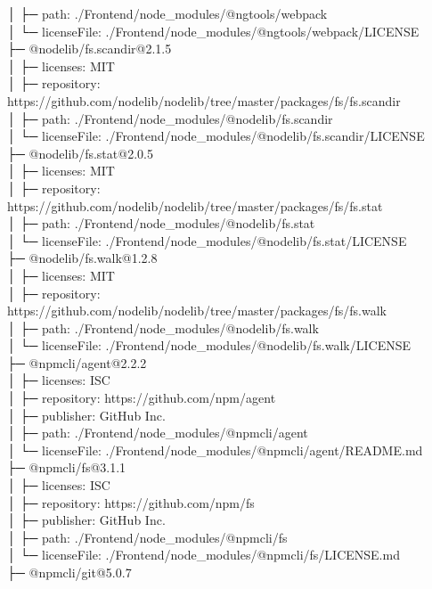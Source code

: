 │  ├─ path: ./Frontend/node\_modules/@ngtools/webpack\\
│  └─ licenseFile: ./Frontend/node\_modules/@ngtools/webpack/LICENSE\\
├─ @nodelib/fs.scandir@2.1.5\\
│  ├─ licenses: MIT\\
│  ├─ repository: https://github.com/nodelib/nodelib/tree/master/packages/fs/fs.scandir\\
│  ├─ path: ./Frontend/node\_modules/@nodelib/fs.scandir\\
│  └─ licenseFile: ./Frontend/node\_modules/@nodelib/fs.scandir/LICENSE\\
├─ @nodelib/fs.stat@2.0.5\\
│  ├─ licenses: MIT\\
│  ├─ repository: https://github.com/nodelib/nodelib/tree/master/packages/fs/fs.stat\\
│  ├─ path: ./Frontend/node\_modules/@nodelib/fs.stat\\
│  └─ licenseFile: ./Frontend/node\_modules/@nodelib/fs.stat/LICENSE\\
├─ @nodelib/fs.walk@1.2.8\\
│  ├─ licenses: MIT\\
│  ├─ repository: https://github.com/nodelib/nodelib/tree/master/packages/fs/fs.walk\\
│  ├─ path: ./Frontend/node\_modules/@nodelib/fs.walk\\
│  └─ licenseFile: ./Frontend/node\_modules/@nodelib/fs.walk/LICENSE\\
├─ @npmcli/agent@2.2.2\\
│  ├─ licenses: ISC\\
│  ├─ repository: https://github.com/npm/agent\\
│  ├─ publisher: GitHub Inc.\\
│  ├─ path: ./Frontend/node\_modules/@npmcli/agent\\
│  └─ licenseFile: ./Frontend/node\_modules/@npmcli/agent/README.md\\
├─ @npmcli/fs@3.1.1\\
│  ├─ licenses: ISC\\
│  ├─ repository: https://github.com/npm/fs\\
│  ├─ publisher: GitHub Inc.\\
│  ├─ path: ./Frontend/node\_modules/@npmcli/fs\\
│  └─ licenseFile: ./Frontend/node\_modules/@npmcli/fs/LICENSE.md\\
├─ @npmcli/git@5.0.7\\
